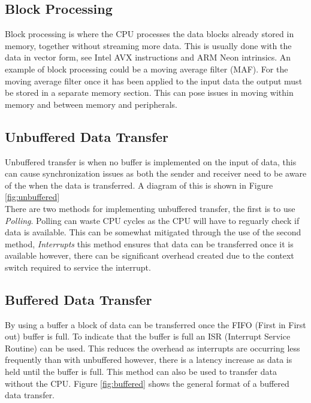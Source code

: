 \subsection{Block Processing}
Block processing is where the CPU processes the data blocks already stored in memory, together
without streaming more data. This is usually done with the data in vector form, see Intel AVX
instructions and ARM Neon intrinsics. An example of block processing could be a moving average
filter (MAF). For the moving average filter once it has been applied to the input data the output
must be stored in a separate memory section. This can pose issues in moving within memory and
between memory and peripherals.

\subsection{Unbuffered Data Transfer}
Unbuffered transfer is when no buffer is implemented on the input of data, this can cause
synchronization issues as both the sender and receiver need to be aware of the when the data is
transferred. A diagram of this is shown in Figure \ref{fig:unbuffered}\\

\noindent There are two methods for implementing unbuffered transfer, the first is to use
\textit{Polling}. Polling can waste CPU cycles as the CPU will have to reguarly check if data is
available. This can be somewhat mitigated through the use of the second method, \textit{Interrupts}
this method ensures that data can be transferred once it is available however, there can be
significant overhead created due to the context switch required to service the interrupt.



\subsection{Buffered Data Transfer}
By using a buffer a block of data can be transferred once the FIFO (First in First out) buffer is
full. To indicate that the buffer is full an ISR (Interrupt Service Routine) can be used. This
reduces the overhead as interrupts are occurring less frequently than with unbuffered however, there
is a latency increase as data is held until the buffer is full. This method can also be used to
transfer data without the CPU. Figure \ref{fig:buffered} shows the general format of a buffered data
transfer.

